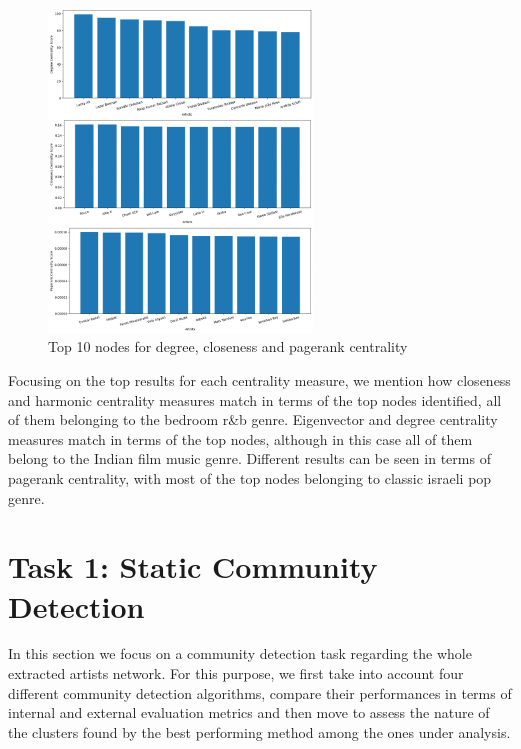 \documentclass[sigchi]{acmart}
\begin{document}
\begin{figure}[H]
\centering
\includegraphics[width=7cm]{img/centr.png}
\caption{Top 10 nodes for degree, closeness and pagerank centrality}
\label{fig: clust_distr}
\end{figure}

Focusing on the top results for each centrality measure, we mention how closeness and harmonic centrality measures match in terms of the top nodes identified, all of them belonging to the bedroom r\&b genre. Eigenvector and degree centrality measures match in terms of the top nodes, although in this case all of them belong to the Indian film music genre. Different results can be seen in terms of pagerank centrality, with most of the top nodes belonging to classic israeli pop genre.


\section{Task 1: Static Community Detection}
In this section we focus on a community detection task regarding the whole extracted artists network. For this purpose, we first take into account four different community detection algorithms, compare their performances in terms of internal and external evaluation metrics and then move to assess the nature of the clusters found by the best performing method among the ones under analysis.
\end{document}
